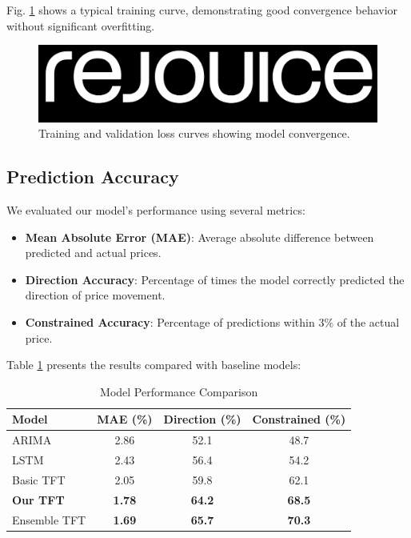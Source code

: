 \documentclass[conference]{IEEEtran}
\begin{document}
Fig. \ref{fig:training_curve} shows a typical training curve, demonstrating good convergence behavior without significant overfitting.

\begin{figure}[h]
\centering
\includegraphics[width=0.9\linewidth]{training_curve.png}
\caption{Training and validation loss curves showing model convergence.}
\label{fig:training_curve}
\end{figure}

\subsection{Prediction Accuracy}

We evaluated our model's performance using several metrics:

\begin{itemize}
\item \textbf{Mean Absolute Error (MAE)}: Average absolute difference between predicted and actual prices.
\item \textbf{Direction Accuracy}: Percentage of times the model correctly predicted the direction of price movement.
\item \textbf{Constrained Accuracy}: Percentage of predictions within 3\% of the actual price.
\end{itemize}

Table \ref{tab:performance} presents the results compared with baseline models:

\begin{table}[h]
\caption{Model Performance Comparison}
\centering
\begin{tabular}{lccc}
\toprule
\textbf{Model} & \textbf{MAE (\%)} & \textbf{Direction (\%)} & \textbf{Constrained (\%)} \\
\midrule
ARIMA & 2.86 & 52.1 & 48.7 \\
LSTM & 2.43 & 56.4 & 54.2 \\
Basic TFT & 2.05 & 59.8 & 62.1 \\
\textbf{Our TFT} & \textbf{1.78} & \textbf{64.2} & \textbf{68.5} \\
Ensemble TFT & \textbf{1.69} & \textbf{65.7} & \textbf{70.3} \\
\bottomrule
\end{tabular}
\label{tab:performance}
\end{table}
\end{document}
